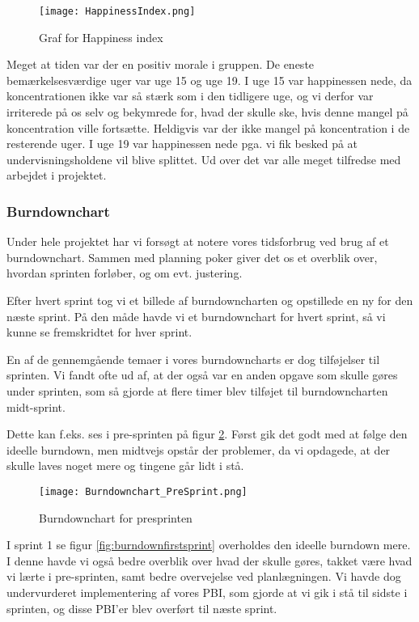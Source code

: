 \begin{figure}[h]
    \caption{Graf for Happiness index}
    \centering
        \texttt{[image: HappinessIndex.png]}
    \label{happinessindex}
\end{figure}

Meget at tiden var der en positiv morale i gruppen.
De eneste bemærkelsesværdige uger var uge 15 og uge 19.
I uge 15 var happinessen nede, da koncentrationen ikke var så stærk som i den tidligere uge, og vi derfor var irriterede på os selv og bekymrede for, hvad der skulle ske, hvis denne mangel på koncentration ville fortsætte.
Heldigvis var der ikke mangel på koncentration i de resterende uger.
I uge 19 var happinessen nede pga. vi fik besked på at undervisningsholdene vil blive splittet.
Ud over det var alle meget tilfredse med arbejdet i projektet.

\subsubsection{Burndownchart}

Under hele projektet har vi forsøgt at notere vores tidsforbrug ved brug af et burndownchart.
Sammen med planning poker giver det os et overblik over, hvordan sprinten forløber, og om evt. justering. 

Efter hvert sprint tog vi et billede af burndowncharten og opstillede en ny for den næste sprint.
På den måde havde vi et burndownchart for hvert sprint, så vi kunne se fremskridtet for hver sprint.

En af de gennemgående temaer i vores burndowncharts er dog tilføjelser til sprinten.
Vi fandt ofte ud af, at der også var en anden opgave som skulle gøres under sprinten, som så gjorde at flere timer blev tilføjet til burndowncharten midt-sprint. 

Dette kan f.eks. ses i pre-sprinten på figur \ref{fig:burndownpresprint}.
Først gik det godt med at følge den ideelle burndown, men midtvejs opstår der problemer, da vi opdagede, at der skulle laves noget mere og tingene går lidt i stå.

\begin{figure}[h]
    \caption{Burndownchart for presprinten}
    \centering
        \texttt{[image: Burndownchart\_PreSprint.png]}
    \label{fig:burndownpresprint}
\end{figure}

I sprint 1 se figur \ref{fig:burndownfirstsprint} overholdes den ideelle burndown mere.
I denne havde vi også bedre overblik over hvad der skulle gøres, takket være hvad vi lærte i pre-sprinten, samt bedre overvejelse ved planlægningen.
Vi havde dog undervurderet implementering af vores PBI, som gjorde at vi gik i stå til sidste i sprinten, og disse PBI'er blev overført til næste sprint.

